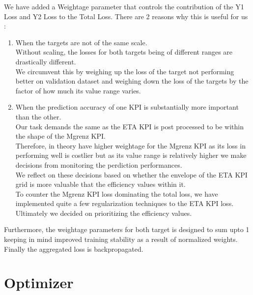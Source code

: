 \documentclass{report} %
\begin{document}
\vspace{1em} %

We have added a Weightage parameter that controls the contribution of the Y1 Loss and Y2 Loss to the Total Loss. There are 2 reasons why this is useful for us :\\

\begin{enumerate}
    \item  When the targets are not of the same scale. \\
    Without scaling, the losses for both targets being of different ranges are drastically different.\\
    We circumvent this by weighing up the loss of the target not performing better on validation dataset and weighing down the loss of the targets by the factor of how much its value range varies. \\
    \item When the prediction accuracy of one \ac{KPI} is substantially more important than the other. \\
    Our task demands the same as the ETA \ac{KPI} is post processed to be within the shape of the Mgrenz \ac{KPI}. \\
    Therefore, in theory have higher weightage for the Mgrenz \ac{KPI} as its loss in performing well is costlier but as its value range is relatively higher we make decisions from monitoring the perdiction performances.\\
    We reflect on these decisions based on whether the envelope of the ETA \ac{KPI} grid is more valuable that the efficiency values within it.\\
    To counter the Mgrenz \ac{KPI} loss dominating the total loss, we have implemented quite a few regularization techniques to the ETA \ac{KPI} loss.\\
    Ultimately we decided on prioritizing the efficiency values.
\end{enumerate}
Furthermore, the weightage parameters for both target is designed to sum upto 1 keeping in mind improved training stability as a result of normalized weights. \\

Finally the aggregated loss is backpropagated.\\
\vspace{0.2cm} %

\section{Optimizer}\label{sec:Optimizer}
\end{document}
